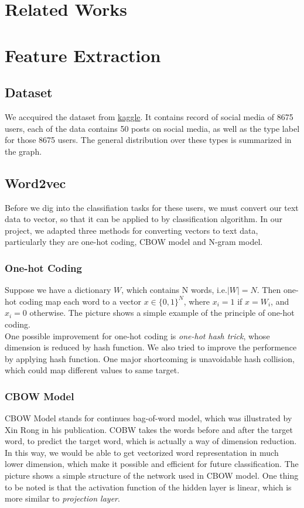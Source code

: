 \documentclass{article}
\begin{document}
\section{Related Works}


\section{Feature Extraction}
\subsection{Dataset}
We accquired the dataset from \href{https://www.kaggle.com/datasnaek/mbti-type}{kaggle}. It contains record of social media of 8675 users, each of the data contains 50 posts on social media, as well as the type label for those 8675 users. The general distribution over these types is summarized in the graph.

\subsection{Word2vec}
Before we dig into the classifiation tasks for these users, we must convert our text data to vector, so that it can be applied to by classification algorithm. In our project, we adapted three methods for converting vectors to text data, particularly they are one-hot coding, CBOW model and N-gram model.

\subsubsection{One-hot Coding}
Suppose we have a dictionary $W$, which contains N words, i.e.$|W|=N$. Then one-hot coding map each word to a vector $x \in \{0,1\}^N$, where $x_i=1$ if $x=W_i$, and $x_i=0$ otherwise. The picture shows a simple example of the principle of one-hot coding.\\
One possible improvement for one-hot coding is \emph{one-hot hash trick}, whose dimension is reduced by hash function. We also tried to improve the performence by applying hash function. One major shortcoming is unavoidable hash collision, which could map different values to same target.

\subsubsection{CBOW Model}
CBOW Model stands for continues bag-of-word model, which was illustrated by Xin Rong in his publication. COBW takes the words before and after the target word, to predict the target word, which is actually a way of dimension reduction. In this way, we would be able to get vectorized word representation in much lower dimension, which make it possible and efficient for future classification. The picture shows a simple structure of the network used in CBOW model. One thing to be noted is that the activation function of the hidden layer is linear, which is more similar to \emph{projection layer}.
\end{document}

